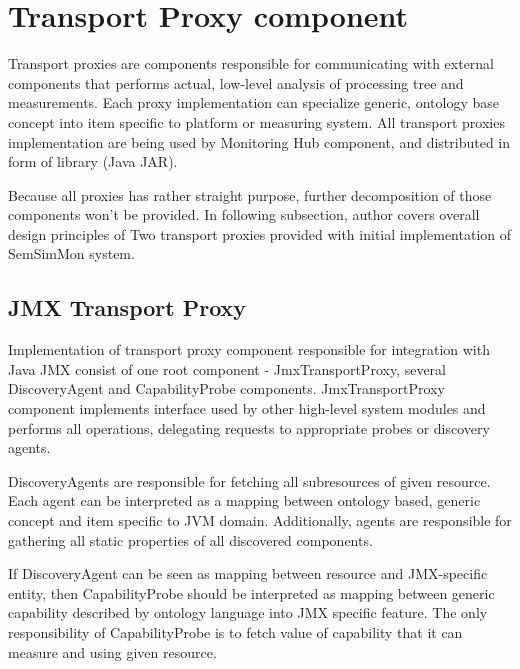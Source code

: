  
%


\section{Transport Proxy component}
\label{sec:arch_tproxy}
 
Transport proxies are components responsible for communicating with external components that performs actual, low-level
analysis of processing tree and measurements. Each proxy implementation can specialize generic, ontology base concept
into item specific to platform or measuring system. All transport proxies implementation are being used by Monitoring
Hub component, and distributed in form of library (Java JAR). 

Because all proxies has rather straight purpose, further decomposition of those components won't be provided. In
following subsection, author covers overall design principles of Two transport proxies provided with initial
implementation of SemSimMon system.

 
\subsection{JMX Transport Proxy}

Implementation of transport proxy component responsible for integration with Java JMX consist of one root component -
JmxTransportProxy, several DiscoveryAgent and CapabilityProbe components. JmxTransportProxy component implements
interface used by other high-level system modules and performs all operations, delegating requests to appropriate
probes or discovery agents.

DiscoveryAgents are responsible for fetching all subresources of given resource. Each agent can be interpreted as a
mapping between ontology based, generic concept and item specific to JVM domain. Additionally, agents are responsible
for gathering all static properties of all discovered components.

If DiscoveryAgent can be seen as mapping between resource and JMX-specific entity, then CapabilityProbe should be
interpreted as mapping between generic capability described by ontology language into JMX specific feature. The only
responsibility of CapabilityProbe is to fetch value of capability that it can measure and using given resource.


